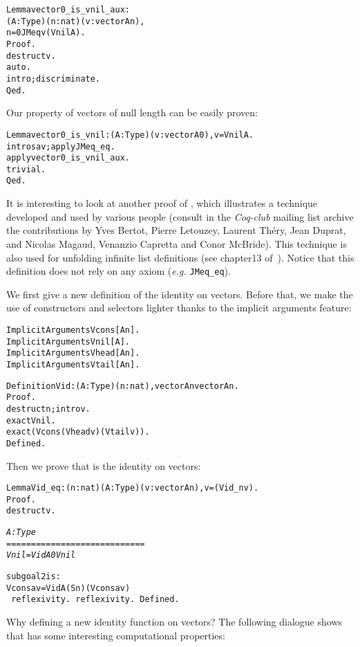 \documentclass[11pt]{article}
\begin{document}
\begin{alltt}
Lemma vector0_is_vnil_aux :
   {\prodsym} (A:Type)(n:nat)(v:vector A n),
      n= 0 {\arrow} JMeq v (Vnil A).
Proof.
 destruct v.
 auto.
 intro; discriminate.
Qed.
\end{alltt}

Our property of vectors of null length can be easily proven:

\begin{alltt}
Lemma vector0_is_vnil : {\prodsym} (A:Type)(v:vector A 0), v = Vnil A.
 intros a v;apply JMeq_eq.
 apply vector0_is_vnil_aux.
 trivial.
Qed.
\end{alltt}

It is interesting to look at another proof of
, which illustrates a technique developed
and used by various people (consult in the \emph{Coq-club} mailing
list archive the contributions by Yves Bertot, Pierre Letouzey, Laurent Théry,
Jean Duprat, and Nicolas Magaud, Venanzio Capretta and Conor McBride).
This technique is also used for unfolding  infinite list definitions
(see chapter13 of~\cite{coqart}).
Notice that this definition does not rely on any axiom (\emph{e.g.} \texttt{JMeq\_eq}).

We first give a new definition of the identity on vectors. Before that,
we make  the use of constructors and selectors lighter thanks to
the implicit arguments feature:

\begin{alltt}
Implicit Arguments Vcons [A n].
Implicit Arguments Vnil [A].
Implicit Arguments Vhead [A n].
Implicit Arguments Vtail [A n].

Definition Vid : {\prodsym} (A : Type)(n:nat), vector A n {\arrow} vector A n.
Proof.
 destruct n; intro v.
 exact Vnil.
 exact (Vcons (Vhead v) (Vtail v)).
Defined.
\end{alltt}


Then we prove that  is the identity on vectors:

\begin{alltt}
Lemma Vid_eq : {\prodsym} (n:nat) (A:Type)(v:vector A n), v=(Vid _ n v).
Proof.
 destruct v.

\it
   A : Type
  ============================
   Vnil = Vid A 0 Vnil

subgoal 2 is:
  Vcons a v = Vid A (S n) (Vcons a v)
\tt
 reflexivity.
 reflexivity.
Defined.
\end{alltt}

Why defining a new identity function on vectors? The following
dialogue shows that  has some interesting computational
properties:
\end{document}
